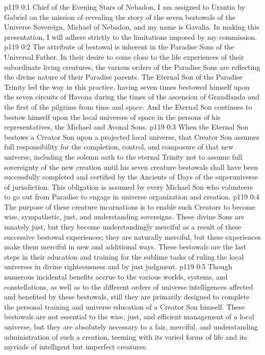 \author{Chief of Evening Stars}
\vs p119 0:1 Chief of the Evening Stars of Nebadon, I am assigned to Urantia by Gabriel on the mission of revealing the story of the seven bestowals of the Universe Sovereign, Michael of Nebadon, and my name is Gavalia. In making this presentation, I will adhere strictly to the limitations imposed by my commission.
\vs p119 0:2 \pc The attribute of bestowal is inherent in the Paradise Sons of the Universal Father. In their desire to come close to the life experiences of their subordinate living creatures, the various orders of the Paradise Sons are reflecting the divine nature of their Paradise parents. The Eternal Son of the Paradise Trinity led the way in this practice, having seven times bestowed himself upon the seven circuits of Havona during the times of the ascension of Grandfanda and the first of the pilgrims from time and space. And the Eternal Son continues to bestow himself upon the local universes of space in the persons of his representatives, the Michael and Avonal Sons.
\vs p119 0:3 When the Eternal Son bestows a Creator Son upon a projected local universe, that Creator Son assumes full responsibility for the completion, control, and composure of that new universe, including the solemn oath to the eternal Trinity not to assume full sovereignty of the new creation until his seven creature bestowals shall have been successfully completed and certified by the Ancients of Days of the superuniverse of jurisdiction. This obligation is assumed by every Michael Son who volunteers to go out from Paradise to engage in universe organization and creation.
\vs p119 0:4 The purpose of these creature incarnations is to enable such Creators to become wise, sympathetic, just, and understanding sovereigns. These divine Sons are innately just, but they become understandingly merciful as a result of these successive bestowal experiences; they are naturally merciful, but these experiences make them merciful in new and additional ways. These bestowals are the last steps in their education and training for the sublime tasks of ruling the local universes in divine righteousness and by just judgment.
\vs p119 0:5 Though numerous incidental benefits accrue to the various worlds, systems, and constellations, as well as to the different orders of universe intelligences affected and benefited by these bestowals, still they are primarily designed to complete the personal training and universe education of a Creator Son himself. These bestowals are not essential to the wise, just, and efficient management of a local universe, but they are absolutely necessary to a fair, merciful, and understanding administration of such a creation, teeming with its varied forms of life and its myriads of intelligent but imperfect creatures.
